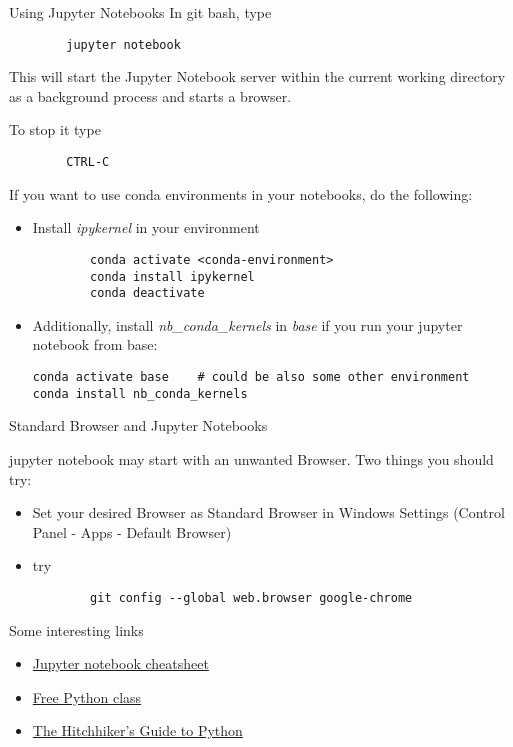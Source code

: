 \begin{frame}[fragile]{Using Jupyter Notebooks}
		In git bash, type
		\begin{verbatim}
		jupyter notebook
		\end{verbatim}
		This will start the Jupyter Notebook server within the current working directory as a background process and starts a browser.

		To stop it type
		\begin{verbatim}
		CTRL-C
		\end{verbatim}

		If you want to use conda environments in your notebooks, do the following:
		\begin{itemize}
			\item Install \textit{ipykernel} in your environment

		\begin{verbatim}
		conda activate <conda-environment>
		conda install ipykernel
		conda deactivate
		\end{verbatim}
		\item Additionally, install \textit{nb\_conda\_kernels} in \textit{base} if you run your jupyter notebook from base:
		\begin{verbatim}
conda activate base    # could be also some other environment
conda install nb_conda_kernels
		 \end{verbatim}
		\end{itemize}
\end{frame}

\begin{frame}[fragile]{Standard Browser and Jupyter Notebooks}

	jupyter notebook may start with an unwanted Browser. Two things you should try:
	\begin{itemize}
		\item Set your desired Browser as Standard Browser in Windows Settings (Control Panel - Apps - Default Browser)
		\item try
			\begin{verbatim}
		git config --global web.browser google-chrome	\end{verbatim}

	\end{itemize}

\end{frame}

\begin{frame}{Some interesting links}
	\begin{itemize}
		\item \href{https://www.edureka.co/blog/wp-content/uploads/2018/10/Jupyter_Notebook_CheatSheet_Edureka.pdf}{Jupyter notebook cheatsheet}

		\item \href{https://www.preisjaeger.at/deals/gratis-it-workshops-e-books-von-packtpubcom-227041}{Free Python class}

		\item \href{https://docs.python-guide.org/}{The Hitchhiker's Guide to Python}

	\end{itemize}


\end{frame}


